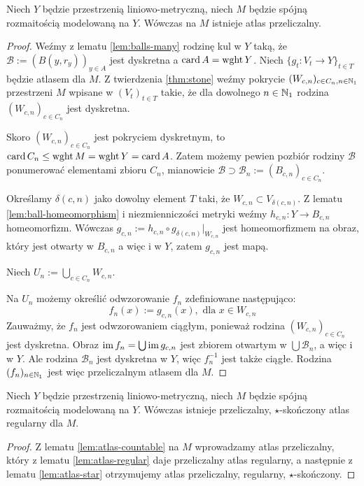 \begin{lem} \label{lem:atlas-countable}
  Niech $Y$ będzie przestrzenią liniowo-metryczną, niech $M$ będzie spójną rozmaitością modelowaną na $Y$. Wówczas na $M$ istnieje atlas przeliczalny.
  \begin{proof}
    Weźmy z lematu \ref{lem:balls-many} rodzinę kul w $Y$ taką, że $\mathcal B := (B(y,r_y))_{y\in A}$ jest dyskretna a $\operatorname{card} A = \operatorname{wght} Y$.
    Niech $\{g_t: V_t \to Y\}_{t \in T}$ będzie atlasem dla $M$.
    Z twierdzenia \ref{thm:stone} weźmy pokrycie $(W_{c,n})_{c \in C_n, n \in {\mathbb{N}_1}}$ przestrzeni $M$ wpisane w $(V_t)_{t \in T}$ takie, że dla dowolnego $n \in {\mathbb{N}_1}$ rodzina $(W_{c,n})_{c \in C_n}$ jest dyskretna.
    
    Skoro $(W_{c,n})_{c \in C_n}$ jest pokryciem dyskretnym, to $\operatorname{card} C_n \leq \operatorname{wght} M = \operatorname{wght} Y = \operatorname{card} A$.
    Zatem możemy pewien pozbiór rodziny $\mathcal B$ ponumerować elementami zbioru $C_n$, mianowicie $\mathcal B \supset \mathcal B_n := (B_{c,n})_{c \in C_n}$.
    
    Określamy $\delta(c,n)$ jako dowolny element $T$ taki, że $W_{c,n} \subset V_{\delta(c,n)}$. Z lematu \ref{lem:ball-homeomorphism} i niezmienniczości metryki weźmy $h_{c,n}: Y \to B_{c,n}$ homeomorfizm. Wówczas $g_{c,n} := h_{c,n} \circ g_{\delta(c,n)}|_{W_{c,n}}$ jest homeomorfizmem na obraz, który jest otwarty w $B_{c,n}$ a więc i w $Y$, zatem $g_{c,n}$ jest mapą.
    
    Niech $U_n := \bigcup_{c \in C_n} W_{c,n}$.
    
    Na $U_n$ możemy określić odwzorowanie $f_n$ zdefiniowane następująco:
    \[
      f_n(x) := g_{c,n}(x),\mbox{ dla }x\in W_{c,n}
    \]
    Zauważmy, że $f_n$ jest odwzorowaniem ciągłym, ponieważ rodzina $(W_{c,n})_{c \in C_n}$ jest dyskretna. Obraz $\operatorname{im} f_n = \bigcup \operatorname{im} g_{c,n}$ jest zbiorem otwartym w $\bigcup \mathcal B_n$, a więc i w $Y$. Ale rodzina $\mathcal B_n$ jest dyskretna w $Y$, więc $f_n^{-1}$ jest także ciągłe.
    Rodzina $(f_n)_{n \in {\mathbb{N}_1}}$ jest więc przeliczalnym atlasem dla $M$.
  \end{proof}
\end{lem}

\begin{thm} \label{thm:super-atlas}
  Niech $Y$ będzie przestrzenią liniowo-metryczną, niech $M$ będzie spójną rozmaitością modelowaną na $Y$. Wówczas istnieje przeliczalny, $\star$-skończony atlas regularny dla $M$.
  \begin{proof}
    Z lematu \ref{lem:atlas-countable} na $M$ wprowadzamy atlas przeliczalny, który z lematu \ref{lem:atlas-regular} daje przeliczalny atlas regularny, a następnie z lematu \ref{lem:atlas-star} otrzymujemy atlas przeliczalny, regularny, $\star$-skończony.
  \end{proof}
\end{thm}
